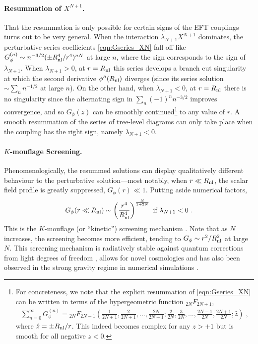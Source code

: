 \documentclass[11pt]{article}
\begin{document}
\paragraph{Resummation of $X^{N+1}$.}
That the resummation is only possible for certain signs of the EFT couplings turns out to be very general. When the interaction $\lambda_{N+1} X^{N+1}$ dominates, the perturbative series coefficients \eqref{eqn:Gseries_XN} fall off like $G^{(n)}_\phi \sim n^{-3/2} ( \pm R_{\rm nl}^{4}/r^{4} )^{nN}$ at large $n$, where the sign corresponds to the sign of $\lambda_{N+1}$. 
When $\lambda_{N+1} > 0$, at $r = R_{\rm nl}$ this series develops a branch cut singularity at which the second derivative $\phi''( R_{\rm nl} )$ diverges (since its series solution $\sim \sum_n n^{-1/2}$ at large $n$). 
On the other hand, when $\lambda_{N+1} < 0$, at $r = R_{\rm nl}$ there is no singularity since the alternating sign in $\sum_n (-1)^n n^{-3/2}$ improves convergence, and so $G_{\phi} (z)$ can be smoothly continued\footnote{
For concreteness, we note that the explicit resummation of \eqref{eqn:Gseries_XN} can be written in terms of the hypergeometric function ${}_{2N} F_{2N+1}$,
\begin{align}
\sum_{n=0}^{\infty} G_\phi^{(n)} =  {}_{2N} F_{2N-1} \left( \tfrac{1}{2N+1} , \tfrac{2}{2N+1} , ... , \tfrac{2N}{2N+1} ; \tfrac{2}{2N} , \tfrac{3}{2N} , ... , \tfrac{2N-1}{2N} , \tfrac{2N+1}{2N}   ;  \hat{z} \right) \; , 
\label{eqn:Gresum_XN}
\end{align}
where $\hat{z} = \pm R_{\rm nl}/r$. This indeed becomes complex for any $z > +1$ but is smooth for all negative $z < 0$. 
} to any value of $r$. 
A smooth resummation of the series of tree-level diagrams can only  take place when the coupling has the right sign, namely $\lambda_{N+1} < 0$.


\paragraph{$K$-mouflage Screening.}
Phenomenologically, the resummed solutions can display qualitatively different behaviour to the perturbative solution---most notably, when $r \ll R_{\rm nl}$, the scalar field profile is greatly suppressed, $G_{\phi} (r) \ll 1$.  
Putting aside numerical factors, 
%
\begin{align}
 G_\phi (r \ll R_{\rm nl} ) \sim \left( \frac{r^4}{R_{\rm nl}^4} \right)^{\frac{N}{1+2N} } \text{ if } \lambda_{N+1} < 0 \; .
 \label{eqn:Gphi_screened}
\end{align}
This is the $K$-mouflage (or ``kinetic'') screening mechanism \cite{Babichev:2009ee}. 
Note that as $N$ increases, the screening becomes more efficient, tending to $G_\phi \sim r^2/ R_{\rm nl}^2$ at large $N$.
This screening mechanism is radiatively stable against quantum corrections from light degrees of freedom \cite{deRham:2014wfa, Brax:2016jjt}, allows for novel cosmologies \cite{Brax:2014wla,Brax:2014yla} and
has also been observed in the strong gravity regime in numerical simulations \cite{terHaar:2020xxb, Bezares:2021yek}. 
\end{document}
